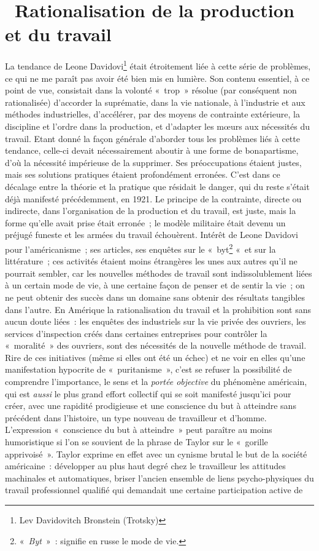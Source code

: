 \documentclass[french,twoside]{book} %
\begin{document}
\section[{ Rationalisation de la production et du travail}]{ Rationalisation de la production et du travail}
\noindent La tendance de Leone Davidovi\footnote{Lev Davidovitch Bronstein (Trotsky)} était étroitement liée à cette série de problèmes, ce qui ne me paraît pas avoir été bien mis en lumière. Son contenu essentiel, à ce point de vue, consistait dans la volonté « trop » résolue (par conséquent non rationalisée) d’accorder la suprématie, dans la vie nationale, à l’industrie et aux méthodes industrielles, d’accélérer, par des moyens de contrainte extérieure, la discipline et l’ordre dans la production, et d’adapter les mœurs aux nécessités du travail. Etant donné la façon générale d’aborder tous les problèmes liés à cette tendance, celle-ci devait nécessairement aboutir à une forme de bonapartisme, d’où la nécessité impérieuse de la supprimer. Ses préoccupations étaient justes, mais ses solutions pratiques étaient profondément erronées. C'est dans ce décalage entre la théorie et la pratique que résidait le danger, qui du reste s’était déjà manifesté précédemment, en 1921. Le principe de la contrainte, directe ou indirecte, dans l’organisation de la production et du travail, est juste, mais la forme qu’elle avait prise était erronée ; le modèle militaire était devenu un préjugé funeste et les armées du travail échouèrent. Intérêt de Leone Davidovi pour l’américanisme ; ses articles, ses enquêtes sur le « byt\footnote{« \emph{Byt} » : signifie en russe le mode de vie.} « et sur la littérature ; ces activités étaient moins étrangères les unes aux autres qu’il ne pourrait sembler, car les nouvelles méthodes de travail sont indissolublement liées à un certain mode de vie, à une certaine façon de penser et de sentir la vie ; on ne peut obtenir des succès dans un domaine sans obtenir des résultats tangibles dans l’autre. En Amérique la rationalisation du travail et la prohibition sont sans aucun doute liées : les enquêtes des industriels sur la vie privée des ouvriers, les services d’inspection créés dans certaines entreprises pour contrôler la « moralité » des ouvriers, sont des nécessités de la nouvelle méthode de travail. Rire de ces initiatives (même si elles ont été un échec) et ne voir en elles qu’une manifestation hypocrite de « puritanisme », c’est se refuser la possibilité de comprendre l’importance, le sens et la \emph{portée objective} du phénomène américain, qui est \emph{aussi} le plus grand effort collectif qui se soit manifesté jusqu’ici pour créer, avec une rapidité prodigieuse et une conscience du but à atteindre sans précédent dans l’histoire, un type nouveau de travailleur et d’homme. L'expression « conscience du but à atteindre » peut paraître au moins humoristique si l’on se souvient de la phrase de Taylor sur le « gorille apprivoisé ». Taylor exprime en effet avec un cynisme brutal le but de la société américaine : développer au plus haut degré chez le travailleur les attitudes machinales et automatiques, briser l’ancien ensemble de liens psycho-physiques du travail professionnel qualifié qui demandait une certaine participation active de 
\end{document}
